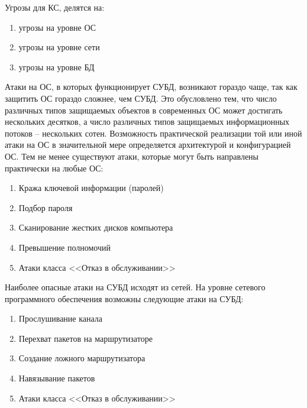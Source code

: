 Угрозы для КС, делятся на:
\begin{enumerate}
	\item угрозы на уровне ОС
	\item угрозы на уровне сети
	\item угрозы на уровне БД
\end{enumerate}
Атаки на ОС, в которых функционирует СУБД, возникают гораздо чаще, так как защитить ОС гораздо сложнее, чем СУБД. Это обусловлено тем, что число различных типов защищаемых объектов в современных ОС может достигать нескольких десятков, а число различных типов защищаемых информационных потоков -- нескольких сотен. Возможность практической реализации той или иной атаки на ОС в значительной мере определяется архитектурой и конфигурацией ОС. Тем не менее существуют атаки, которые могут быть направлены практически на любые ОС:
\begin{enumerate}
	\item Кража ключевой информации (паролей)
	\item Подбор пароля
	\item Сканирование жестких дисков компьютера
	\item Превышение полномочий
	\item Атаки класса <<Отказ в обслуживании>>
\end{enumerate}
Наиболее опасные атаки на СУБД исходят из сетей. На уровне сетевого
программного обеспечения возможны следующие атаки на СУБД:
\begin{enumerate}
	\item Прослушивание канала
	\item Перехват пакетов на маршрутизаторе
	\item Создание ложного маршрутизатора
	\item Навязывание пакетов
	\item Атаки класса <<Отказ в обслуживании>>
\end{enumerate}

